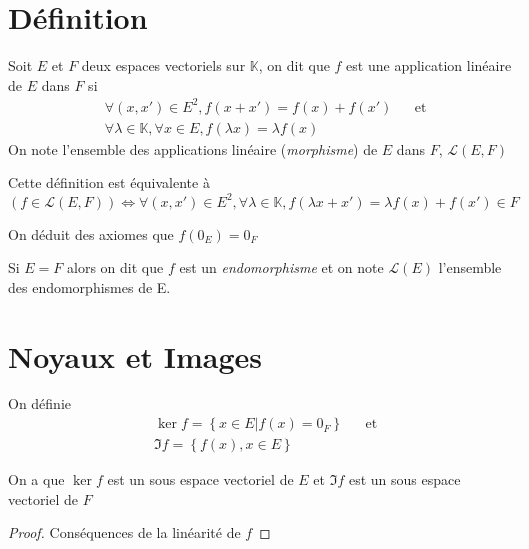 \documentclass[11pt,colorlinks]{book}
\theoremstyle{mytheoremstyle}
\theoremstyle{mytheoremstyle}
\theoremstyle{mytheoremstyle}
\theoremstyle{mytheoremstyle}
\theoremstyle{mytheoremstyle}
\theoremstyle{mytheoremstyle}
\theoremstyle{mytheoremstyle}
\theoremstyle{mytheoremstyle}
\theoremstyle{myproblemstyle}
\def\mbb#1{\mathbb{#1}}
\def\mfc#1{\mathcal{#1}}
\def\bK{\mbb{K}}
\def\sev{sous espace vectoriel }
\begin{document}
\section{Définition}
\begin{definition}
  Soit $E$ et $F$ deux espaces vectoriels sur $\bK$, on dit que $f$ est une application linéaire de $E$ dans $F$ si
  \begin{align*}
    &\forall (x,x') \in E^2, f(x+x') = f(x) + f(x') && \text{et} \\
    &\forall \lambda \in \bK, \forall x \in E, f(\lambda x) = \lambda f(x)
  \end{align*}
  On note l'ensemble des applications linéaire (\textit{morphisme}) de $E$ dans $F$, $\mfc{L}(E,F)$
\end{definition}
\begin{rmq}
  Cette définition est équivalente à 
  \begin{equation*}
    (f \in \mfc{L}(E,F)) \Leftrightarrow \forall (x,x') \in E^2, \forall \lambda \in \bK, f(\lambda x + x') = \lambda f(x) + f(x') \in F
  \end{equation*}
\end{rmq}
\begin{rmq}
  On déduit des axiomes que $f(0_E) = 0_F$
\end{rmq}
\begin{rmq}
  Si $E = F$ alors on dit que $f$ est un \textit{endomorphisme} et on note $\mfc{L}(E)$ l'ensemble des endomorphismes de E.
\end{rmq}
\section{Noyaux et Images}
\begin{definition}
  On définie
  \begin{align*}
    &\ker f = \left\{x \in E | f(x) = 0_F\right\} && \text{et} \\ 
    &\Im f = \left\{f(x), x \in E\right\}
  \end{align*}
\end{definition}
\begin{prop}
  On a que $\ker f$ est un \sev  de $E$ et $\Im f$ est un \sev  de $F$
  \begin{proof}
    Conséquences de la linéarité de $f$
  \end{proof}
\end{prop}
\end{document}
